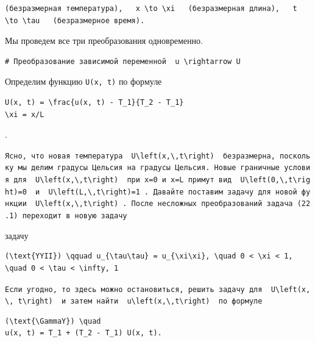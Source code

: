 \documentclass[
  ukrainian,
]{article}
\begin{document}
\begin{verbatim}
(безразмерная температура),   x \to \xi   (безразмерная длина),   t \to \tau   (безразмерное время).
\end{verbatim}

Мы проведем все три преобразования одновременно.

\begin{verbatim}
# Преобразование зависимой переменной  u \rightarrow U
\end{verbatim}

Определим функцию \texttt{U(x,\ t)} по формуле

\begin{verbatim}
U(x, t) = \frac{u(x, t) - T_1}{T_2 - T_1}
\xi = x/L
\end{verbatim}

.

\texttt{Ясно,\ что\ новая\ температура\ \ \textquotesingle{}U\textbackslash{}left(x,\textbackslash{},t\textbackslash{}right)\textquotesingle{}\ \ безразмерна,\ поскольку\ мы\ делим\ градусы\ Цельсия\ на\ градусы\ Цельсия.\ Новые\ граничные\ условия\ для\ \ \textquotesingle{}U\textbackslash{}left(x,\textbackslash{},t\textbackslash{}right)\textquotesingle{}\ \ при\ x=0\ и\ x=L\ примут\ вид\ \ \textquotesingle{}U\textbackslash{}left(0,\textbackslash{},t\textbackslash{}right)=0\textquotesingle{}\ \ и\ \ \textquotesingle{}U\textbackslash{}left(L,\textbackslash{},t\textbackslash{}right)=1\textquotesingle{}\ .\ Давайте\ поставим\ задачу\ для\ новой\ функции\ \ \textquotesingle{}U\textbackslash{}left(x,\textbackslash{},t\textbackslash{}right)\textquotesingle{}\ .\ После\ несложных\ преобразований\ задача\ (22.1)\ переходит\ в\ новую\ задачу}

задачу

\begin{verbatim}
(\text{YYII}) \qquad u_{\tau\tau} = u_{\xi\xi}, \quad 0 < \xi < 1, \quad 0 < \tau < \infty, 1
\end{verbatim}

\texttt{Если\ угодно,\ то\ здесь\ можно\ остановиться,\ решить\ задачу\ для\ \ \textquotesingle{}U\textbackslash{}left(x,\textbackslash{},\ t\textbackslash{}right)\textquotesingle{}\ \ и\ затем\ найти\ \ \textquotesingle{}u\textbackslash{}left(x,\textbackslash{},t\textbackslash{}right)\textquotesingle{}\ \ по\ формуле}

\begin{verbatim}
(\text{\GammaY}) \quad
u(x, t) = T_1 + (T_2 - T_1) U(x, t).
\end{verbatim}
\end{document}
